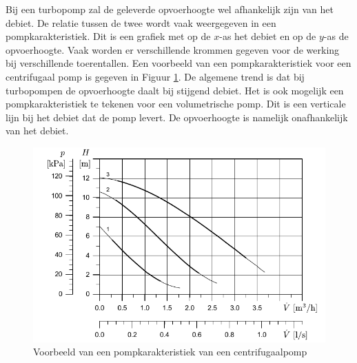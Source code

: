 Bij een turbopomp zal de geleverde opvoerhoogte wel afhankelijk zijn van het debiet. De relatie tussen de twee wordt vaak weergegeven in een pompkarakteristiek. Dit is een grafiek met op de $x$-as het debiet en op de $y$-as de opvoerhoogte. Vaak worden er verschillende krommen gegeven voor de werking bij verschillende toerentallen. Een voorbeeld van een pompkarakteristiek voor een centrifugaal pomp is gegeven in Figuur \ref{fig:Pompkarakteristiek}. De algemene trend is dat bij turbopompen de opvoerhoogte daalt bij stijgend debiet. Het is ook mogelijk een pompkarakteristiek te tekenen voor een volumetrische pomp. Dit is een verticale lijn bij het debiet dat de pomp levert. De opvoerhoogte is namelijk onafhankelijk van het debiet.
\begin{figure}
	\centering
	\includegraphics{fig/leidingstelsels/Pompkarakteristiek_UPS_25_120}
	\caption{Voorbeeld van een pompkarakteristiek van een centrifugaalpomp}
	\label{fig:Pompkarakteristiek}
\end{figure}

